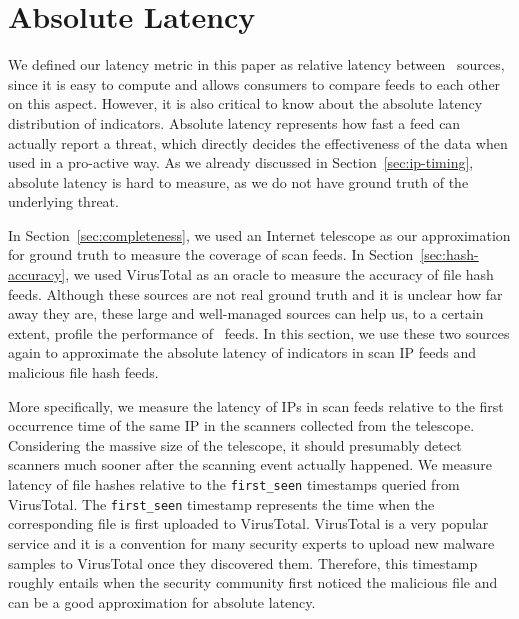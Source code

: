 \section{Absolute Latency}
\label{sec:abs_latency}

We defined our latency metric in this paper as relative latency between \ti\
sources, since it is easy to compute and allows consumers to compare feeds
to each other on this aspect. However, it is also critical to know
about the absolute latency distribution of indicators. Absolute latency
represents how fast a feed can actually report a threat, which directly decides
the effectiveness of the data when used in a pro-active way. As we already
discussed in Section~\ref{sec:ip-timing}, absolute latency is hard to measure,
as we do not have ground truth of the underlying threat.

In Section~\ref{sec:completeness}, we used an Internet telescope as our approximation
for ground truth to measure the coverage of scan feeds. In Section~\ref{sec:hash-accuracy},
we used VirusTotal as an oracle to measure the accuracy of file hash feeds.
Although these sources are not real ground truth and it is unclear how far away
they are, these large and well-managed sources can help us, to a certain extent,
profile the performance of \ti\ feeds. In this section, we use these two sources
again to approximate the absolute latency of indicators in scan IP feeds and
malicious file hash feeds.

More specifically, we measure the latency of IPs in scan feeds
relative to the first occurrence time of the same IP in the scanners collected from
the telescope. Considering the massive size of the telescope, it should presumably
detect scanners much sooner after the scanning event actually happened.
We measure latency of file hashes relative to the \texttt{first\_seen} timestamps queried
from VirusTotal. The \texttt{first\_seen} timestamp represents the time when the corresponding
file is first uploaded to VirusTotal. VirusTotal is a very popular service and it is a
convention for many security experts to upload new malware samples to VirusTotal once
they discovered them. Therefore, this timestamp roughly entails when the security
community first noticed the malicious file and can be a good approximation for absolute
latency.

